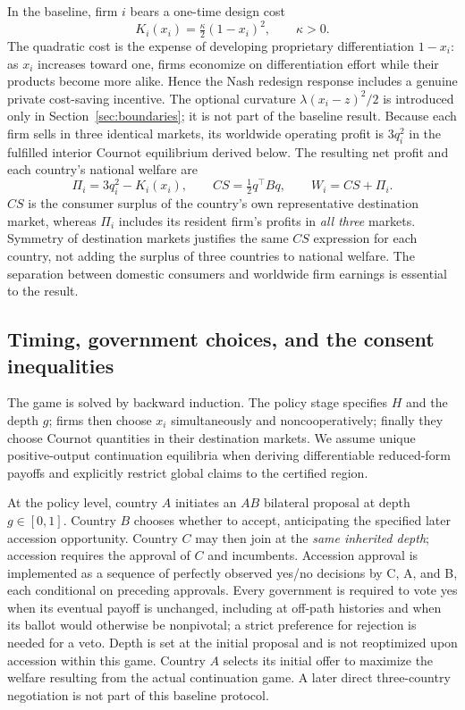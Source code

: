 \documentclass[11pt,a4paper]{article}
\theoremstyle{remark}\newtheorem{remark}[theorem]{Remark}
\begin{document}
In the baseline, firm $i$ bears a one-time design cost
\begin{equation}\label{eq:cost}
K_i(x_i)=\tfrac{\kappa}{2}(1-x_i)^2,\qquad\kappa>0.
\end{equation}
The quadratic cost is the expense of developing proprietary differentiation $1-x_i$: as $x_i$ increases toward one, firms economize on differentiation effort while their products become more alike. Hence the Nash redesign response includes a genuine private cost-saving incentive. The optional curvature $\lambda(x_i-z)^2/2$ is introduced only in Section~\ref{sec:boundaries}; it is not part of the baseline result. Because each firm sells in three identical markets, its worldwide operating profit is $3q_i^2$ in the fulfilled interior Cournot equilibrium derived below. The resulting net profit and each country's national welfare are
\begin{equation}\label{eq:welfare}
\Pi_i=3q_i^2-K_i(x_i),\qquad CS=\tfrac12q^{\top}Bq,\qquad W_i=CS+\Pi_i.
\end{equation}
$CS$ is the consumer surplus of the country's own representative destination market, whereas $\Pi_i$ includes its resident firm's profits in \emph{all three} markets. Symmetry of destination markets justifies the same $CS$ expression for each country, not adding the surplus of three countries to national welfare. The separation between domestic consumers and worldwide firm earnings is essential to the result.

\subsection{Timing, government choices, and the consent inequalities}
The game is solved by backward induction. The policy stage specifies $H$ and the depth $g$; firms then choose $x_i$ simultaneously and noncooperatively; finally they choose Cournot quantities in their destination markets. We assume unique positive-output continuation equilibria when deriving differentiable reduced-form payoffs and explicitly restrict global claims to the certified region.

At the policy level, country $A$ initiates an $AB$ bilateral proposal at depth $g\in[0,1]$. Country $B$ chooses whether to accept, anticipating the specified later accession opportunity. Country $C$ may then join at the \emph{same inherited depth}; accession requires the approval of $C$ and incumbents. Accession approval is implemented as a sequence of perfectly observed yes/no decisions by C, A, and B, each conditional on preceding approvals. Every government is required to vote yes when its eventual payoff is unchanged, including at off-path histories and when its ballot would otherwise be nonpivotal; a strict preference for rejection is needed for a veto. Depth is set at the initial proposal and is not reoptimized upon accession within this game. Country $A$ selects its initial offer to maximize the welfare resulting from the actual continuation game. A later direct three-country negotiation is not part of this baseline protocol.
\end{document}
